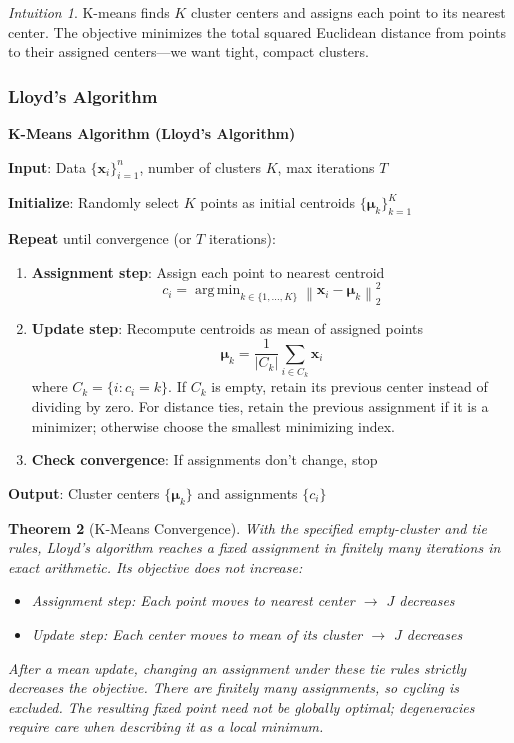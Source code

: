 \documentclass[11pt,twoside]{article}
\numberwithin{equation}{section}
\DeclareMathOperator*{\argmin}{arg\,min}
\newcommand{\vect}[1]{\bm{#1}}
\newcommand{\norm}[1]{\left\lVert#1\right\rVert}
\theoremstyle{plain}
\newtheorem{theorem}{Theorem}[section]
\theoremstyle{definition}
\theoremstyle{remark}
\newtheorem{intuition}[theorem]{Intuition}
\begin{document}
\begin{intuition}
K-means finds $K$ cluster centers and assigns each point to its nearest center. The objective minimizes the total squared Euclidean distance from points to their assigned centers---we want tight, compact clusters.
\end{intuition}

\subsubsection{Lloyd's Algorithm}

\begin{algorithmbox}
\textbf{K-Means Algorithm (Lloyd's Algorithm)}

\textbf{Input}: Data $\{\vect{x}_i\}_{i=1}^n$, number of clusters $K$, max iterations $T$

\textbf{Initialize}: Randomly select $K$ points as initial centroids $\{\vect{\mu}_k\}_{k=1}^K$

\textbf{Repeat} until convergence (or $T$ iterations):
\begin{enumerate}
\item \textbf{Assignment step}: Assign each point to nearest centroid
\[
c_i = \argmin_{k \in \{1,\ldots,K\}} \norm{\vect{x}_i - \vect{\mu}_k}_2^2
\]

\item \textbf{Update step}: Recompute centroids as mean of assigned points
\[
\vect{\mu}_k = \frac{1}{|C_k|}\sum_{i \in C_k} \vect{x}_i
\]
where $C_k=\{i:c_i=k\}$. If $C_k$ is empty, retain its previous center instead of dividing by zero. For distance ties, retain the previous assignment if it is a minimizer; otherwise choose the smallest minimizing index.

\item \textbf{Check convergence}: If assignments don't change, stop
\end{enumerate}

\textbf{Output}: Cluster centers $\{\vect{\mu}_k\}$ and assignments $\{c_i\}$
\end{algorithmbox}

\begin{theorem}[K-Means Convergence]
With the specified empty-cluster and tie rules, Lloyd's algorithm reaches a fixed assignment in finitely many iterations in exact arithmetic. Its objective does not increase:
\begin{itemize}
\item Assignment step: Each point moves to nearest center $\to$ $J$ decreases
\item Update step: Each center moves to mean of its cluster $\to$ $J$ decreases
\end{itemize}
After a mean update, changing an assignment under these tie rules strictly decreases the objective. There are finitely many assignments, so cycling is excluded. The resulting fixed point need not be globally optimal; degeneracies require care when describing it as a local minimum.
\end{theorem}
\end{document}

